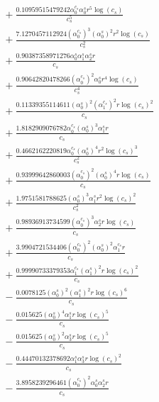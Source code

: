 \documentclass[10pt]{article}
\begin{document}
\begin{align*}
&{}  + \frac{0.10959515479242 \alpha_{0}^{c_s} \alpha_{0}^s r^{5} \log{\left(c_{s} \right)}}{c_{s}^{5}} \\
&{}  + \frac{7.1270457112924 \left(\alpha_{0}^{c_s}\right)^{3} \left(\alpha_{0}^s\right)^{2} r^{2} \log{\left(c_{s} \right)}}{c_{s}^{2}} \\
&{}  + \frac{0.90387358971276 \alpha_{0}^s \alpha_{1}^s \alpha_{2}^s r}{c_{s}} \\
&{}  + \frac{0.90642820478266 \left(\alpha_{0}^{c_s}\right)^{2} \alpha_{0}^s r^{4} \log{\left(c_{s} \right)}}{c_{s}^{4}} \\
&{}  + \frac{0.11339355114611 \left(\alpha_{0}^s\right)^{2} \left(\alpha_{1}^{c_s}\right)^{2} r \log{\left(c_{s} \right)}^{2}}{c_{s}} \\
&{}  + \frac{1.8182909076782 \alpha_{0}^{c_s} \left(\alpha_{0}^s\right)^{3} \alpha_{1}^s r}{c_{s}} \\
&{}  + \frac{0.4662162220819 \alpha_{0}^{c_s} \left(\alpha_{0}^s\right)^{4} r^{2} \log{\left(c_{s} \right)}^{3}}{c_{s}^{2}} \\
&{}  + \frac{0.93999642860003 \left(\alpha_{0}^{c_s}\right)^{2} \left(\alpha_{0}^s\right)^{4} r \log{\left(c_{s} \right)}}{c_{s}} \\
&{}  + \frac{1.9751581788625 \left(\alpha_{0}^s\right)^{3} \alpha_{1}^s r^{2} \log{\left(c_{s} \right)}^{2}}{c_{s}^{2}} \\
&{}  + \frac{0.98936913734599 \left(\alpha_{0}^{c_s}\right)^{3} \alpha_{2}^s r \log{\left(c_{s} \right)}}{c_{s}} \\
&{}  + \frac{3.9904721534406 \left(\alpha_{0}^{c_s}\right)^{2} \left(\alpha_{0}^s\right)^{2} \alpha_{1}^{c_s} r}{c_{s}} \\
&{}  + \frac{0.99990733379353 \alpha_{1}^{c_s} \left(\alpha_{1}^s\right)^{2} r \log{\left(c_{s} \right)}^{2}}{c_{s}} \\
&{}  - \frac{0.0078125 \left(\alpha_{0}^s\right)^{2} \left(\alpha_{1}^s\right)^{2} r \log{\left(c_{s} \right)}^{6}}{c_{s}} \\
&{}  - \frac{0.015625 \left(\alpha_{0}^s\right)^{4} \alpha_{1}^s r \log{\left(c_{s} \right)}^{5}}{c_{s}} \\
&{}  - \frac{0.015625 \left(\alpha_{0}^s\right)^{2} \alpha_{3}^s r \log{\left(c_{s} \right)}^{5}}{c_{s}} \\
&{}  - \frac{0.44470132378692 \alpha_{1}^s \alpha_{3}^s r \log{\left(c_{s} \right)}^{2}}{c_{s}} \\
&{}  - \frac{3.8958239296461 \left(\alpha_{0}^{c_s}\right)^{2} \alpha_{0}^s \alpha_{2}^s r}{c_{s}} \\

\end{align*}
\end{document}
